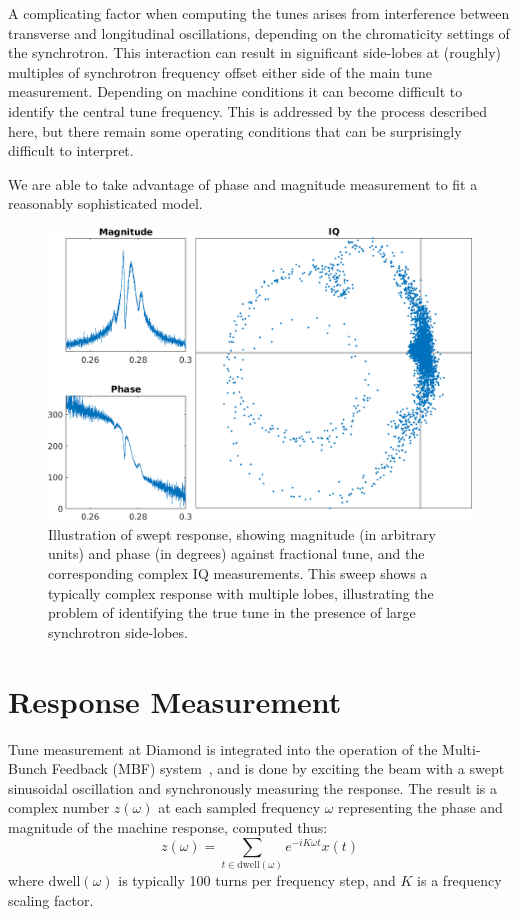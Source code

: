 \documentclass[
    a4paper,
    keeplastbox,            %
    hyphens,                %
    nospread,               %
    refpage,                %
]{jacow}
\newcommand{\squarecaption}[2][1]{\caption[#1]{#2\unskip\parfillskip 0pt}}
\begin{document}
A complicating factor when computing the tunes arises from interference between
transverse and longitudinal oscillations, depending on the chromaticity settings
of the synchrotron.  This interaction can result in significant side-lobes at
(roughly) multiples of synchrotron frequency offset either side of the main tune
measurement.  Depending on machine conditions it can become difficult to
identify the central tune frequency.  This is addressed by the process described
here, but there remain some operating conditions that can be surprisingly
difficult to interpret.

We are able to take advantage of phase and magnitude measurement to fit a
reasonably sophisticated model.


\begin{figure}[ht]
\includegraphics[width=\linewidth]{WECO03f1.png}
\squarecaption{%
Illustration of swept response, showing magnitude (in arbitrary units) and phase
(in degrees) against fractional tune, and the corresponding complex IQ
measurements.  This sweep shows a typically complex response with multiple
lobes, illustrating the problem of identifying the true tune in the presence of
large synchrotron side-lobes.
}
\label{fig:response}
\end{figure}


\section{Response Measurement}

Tune measurement at Diamond is integrated into the operation of the Multi-Bunch
Feedback (MBF) system~\cite{icalepcs2017}, and is done by exciting the beam with
a swept sinusoidal oscillation and synchronously measuring the response.  The
result is a complex number $z(\omega)$ at each sampled frequency $\omega$
representing the phase and magnitude of the machine response, computed thus:
\[
    z(\omega) = \sum_{t\in\text{dwell}(\omega)} e^{-iK\omega t} x(t)
\]
where $\text{dwell}(\omega)$ is typically 100 turns per frequency step, and $K$
is a frequency scaling factor.
\end{document}

